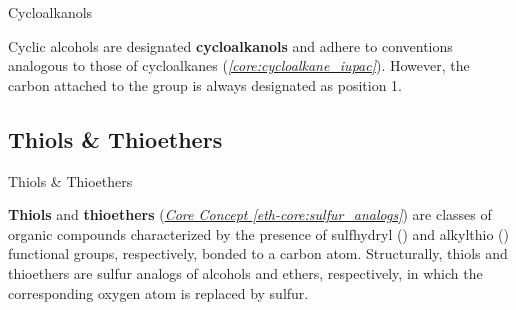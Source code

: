 \documentclass[10pt]{article}
\begin{document}
      \begin{core}{Cycloalkanols}

        Cyclic alcohols are designated \textbf{cycloalkanols} and adhere to conventions analogous to those of cycloalkanes (\textit{\autoref{core:cycloalkane_iupac}}). However, the carbon attached to the  group is always designated as position 1. 


      \end{core}


  \subsection{Thiols \& Thioethers}

    \begin{core}{Thiols \& Thioethers}

      \textbf{Thiols} and \textbf{thioethers} (\textit{\hyperref[eth-core:sulfur_analogs]{Core Concept \ref*{eth-core:sulfur_analogs}}}) are classes of organic compounds characterized by the presence of sulfhydryl (\textit{}) and alkylthio (\textit{}) functional groups, respectively, bonded to a carbon atom. Structurally, thiols and thioethers are sulfur analogs of alcohols and ethers, respectively, in which the corresponding oxygen atom is replaced by sulfur.

    \end{core}
\end{document}
